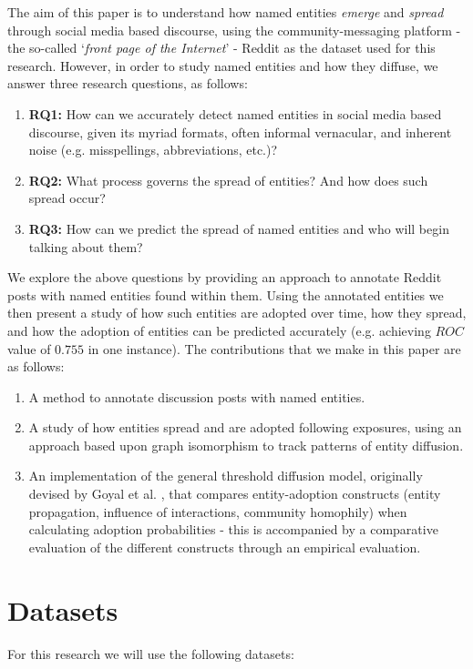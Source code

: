 \documentclass[journal,10pt,draftclsnofoot,onecolumn]{IEEEtran}
\begin{document}
The aim of this paper is to understand how named entities \emph{emerge} and \emph{spread} through social media based discourse, using the community-messaging platform - the so-called `\emph{front page of the Internet}' - Reddit as the dataset used for this research.
However, in order to study named entities and how they diffuse, we answer three research questions, as follows:
\begin{enumerate}
	\item \textbf{RQ1:} How can we accurately detect named entities in social media based discourse, given its myriad formats, often informal vernacular, and inherent noise (e.g. misspellings, abbreviations, etc.)?
	\item \textbf{RQ2:} What process governs the spread of entities? And how does such spread occur?
	\item \textbf{RQ3:} How can we predict the spread of named entities and who will begin talking about them?	
\end{enumerate}

We explore the above questions by providing an approach to annotate Reddit posts with named entities found within them.
Using the annotated entities we then present a study of how such entities are adopted over time, how they spread, and how the adoption of entities can be predicted accurately (e.g. achieving $ROC$ value of $0.755$ in one instance).
The contributions that we make in this paper are as follows:

\begin{enumerate}
	\item A method to annotate discussion posts with named entities.
	\item A study of how entities spread and are adopted following exposures, using an approach based upon graph isomorphism to track patterns of entity diffusion.
	\item An implementation of the general threshold diffusion model, originally devised by Goyal et al. \cite{goyal2010learning}, that compares entity-adoption constructs (entity propagation, influence of interactions, community homophily) when calculating adoption probabilities - this is accompanied by a comparative evaluation of the different constructs through an empirical evaluation.
\end{enumerate}

\section{Datasets}
For this research we will use the following datasets:
\end{document}

